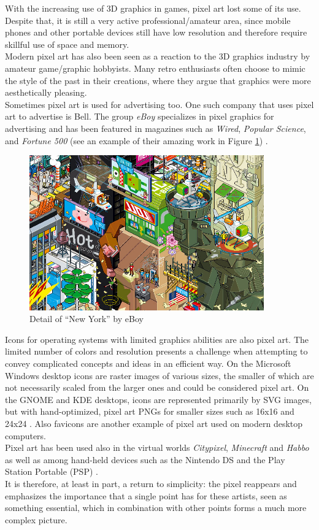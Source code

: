 \documentclass[]{usiinfbachelorproject}
\begin{document}
With the increasing use of 3D graphics in games, pixel art lost some of its use. Despite that, it is still a very active professional/amateur area, since mobile phones and other portable devices still have low resolution and therefore require skillful use of space and memory. \\
Modern pixel art has also been seen as a reaction to the 3D graphics industry by amateur game/graphic hobbyists. Many retro enthusiasts often choose to mimic the style of the past in their creations, where they argue that graphics were more aesthetically pleasing.\\
Sometimes pixel art is used for advertising too. One such company that uses pixel art to advertise is Bell. The group \emph{eBoy} specializes in pixel graphics for advertising and has been featured in magazines such as \emph{Wired}, \emph{Popular Science}, and \emph{Fortune 500} (see an example of their amazing work in Figure \ref{fig:eboy}) \cite{Wiki:pixelart}.\\

\begin{figure} [ht]
	\centering
	\includegraphics[width=0.9\textwidth]{img/eboy.jpeg}
	\caption{Detail of ``New York'' by eBoy}
	\label{fig:eboy}
\end{figure}

Icons for operating systems with limited graphics abilities are also pixel art. The limited number of colors and resolution presents a challenge when attempting to convey complicated concepts and ideas in an efficient way. On the Microsoft Windows desktop icons are raster images of various sizes, the smaller of which are not necessarily scaled from the larger ones and could be considered pixel art. On the GNOME and KDE desktops, icons are represented primarily by SVG images, but with hand-optimized, pixel art PNGs for smaller sizes such as 16x16 and 24x24 \cite{Wiki:pixelart}. Also favicons are another example of pixel art used on modern desktop computers.\\
Pixel art has been used also in the virtual worlds \emph{Citypixel}, \emph{Minecraft} and \emph{Habbo} as well as among hand-held devices such as the Nintendo DS and the Play Station Portable (PSP) \cite{Wiki:pixelart}.\\
It is therefore, at least in part, a return to simplicity: the pixel reappears and emphasizes the importance that a single point has for these artists, seen as something essential, which in combination with other points forms a much more complex picture.
\end{document}

